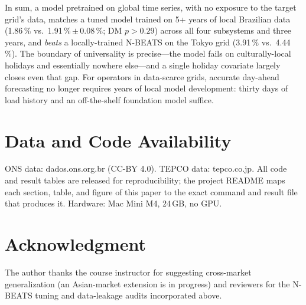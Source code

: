 \documentclass[conference]{IEEEtran}
\begin{document}
In sum, a model pretrained on global time series, with no exposure to the target grid's
data, matches a tuned model trained on 5+ years of local Brazilian data
(1.86\,\% vs.\ 1.91\,\%\,$\pm$\,0.08\,\%; DM $p>0.29$) across all four subsystems and
three years, and \emph{beats} a locally-trained N-BEATS on the Tokyo grid (3.91\,\% vs.\
4.44\,\%). The boundary of universality is precise---the model fails on culturally-local
holidays and essentially nowhere else---and a single holiday covariate largely closes
even that gap. For operators in data-scarce grids, accurate day-ahead forecasting no
longer requires years of local model development: thirty days of load history and an
off-the-shelf foundation model suffice.

\section*{Data and Code Availability}
ONS data: dados.ons.org.br (CC-BY 4.0). TEPCO data: tepco.co.jp. All code and result tables
are released for reproducibility; the project README maps each section, table, and figure of
this paper to the exact command and result file that produces it. Hardware: Mac Mini M4, 24\,GB,
no GPU.

\section*{Acknowledgment}
The author thanks the course instructor for suggesting cross-market generalization (an
Asian-market extension is in progress) and reviewers for the N-BEATS tuning and
data-leakage audits incorporated above.
\end{document}
